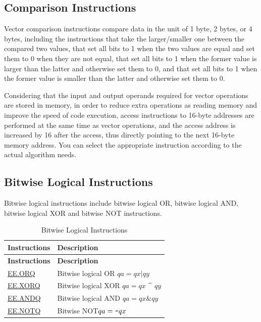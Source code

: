 \documentclass[main\_\_EN.tex]{subfiles}
\begin{document}
\subsection{Comparison Instructions}
\label{sec:pie-comparison-instrucitons}

Vector comparison instructions compare data in the unit of 1 byte, 2 bytes, or 4 bytes, including the instructions that take the larger/smaller one between the compared two values, that set all bits to 1 when the two values are equal and set them to 0 when they are not equal, that set all bits to 1 when the former value is larger than the latter and otherwise set them to 0, and that set all bits to 1 when the former value is smaller than the latter and otherwise set them to 0.

Considering that the input and output operands required for vector operations are stored in memory, in order to
reduce extra operations as reading memory and improve the speed of code execution, access instructions
to 16-byte addresses are performed at the same time as vector operations, and the access address is
increased by 16 after the access, thus directly pointing to the next 16-byte memory address. You can
select the appropriate instruction according to the actual algorithm needs.



\subsection{Bitwise Logical Instructions}
\label{sec:pie-bitwise-logic-instrucitons}

Bitwise logical instructions include bitwise logical OR, bitwise logical AND, bitwise logical XOR and bitwise NOT instructions.

\begin{longtable}[c]{|l|m{10cm}|}
    \caption{Bitwise Logical Instructions}
    \label{tab:pie-bitwise-logic-instructions}\\
    \hline
    \rowcolor{lightgray}
    \textbf{Instructions} & \textbf{Description} \\\hline
    \endfirsthead
    \rowcolor{lightgray}
    \textbf{Instructions} & \textbf{Description} \\\hline
    \endhead
    \endfoot

    \hyperref[instruction:EEORQ]{EE.ORQ} & Bitwise logical OR $qa = qx | qy$
    \\\hline
    \hyperref[instruction:EEXORQ]{EE.XORQ} & Bitwise logical XOR $qa = qx$ \^{} $qy$
    \\\hline
    \hyperref[instruction:EEANDQ]{EE.ANDQ} & Bitwise logical AND $qa = qx \& qy$
    \\\hline
    \hyperref[instruction:EENOTQ]{EE.NOTQ} & Bitwise NOT$qa =\verb+~+ qx$
    \\\hline
\end{longtable}
\end{document}
